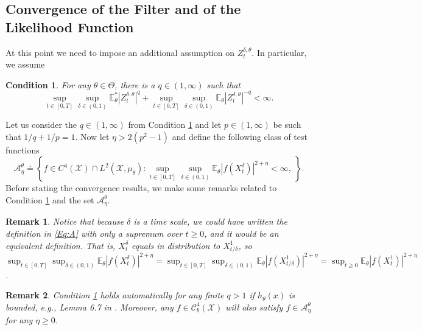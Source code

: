 \documentclass{article}
\newtheorem{remark}{ Remark}
\newtheorem{condition}{Condition}[section]
\begin{document}
\subsection{Convergence of the Filter and of the Likelihood Function}\label{SS:filterLimit}
At this point we need to impose an additional assumption on $Z^{\delta,\theta}_{t}$. In particular, we assume
\begin{condition}
\label{A:Assumption2}
For any $\theta\in\Theta$, there is a $q\in(1,\infty)$ such that
\[
\sup_{t\in[0,T]}\sup_{\delta\in(0,1)}\mathbb{E}_{\theta}^{*}|Z^{\delta,\theta}_{t}|^{q}+\sup_{t\in[0,T]}\sup_{\delta\in(0,1)}\mathbb{E}_{\theta}|Z^{\delta,\theta}_{t}|^{-q}<\infty.
\]
\end{condition}
Let us consider the $q\in(1,\infty)$ from Condition \ref{A:Assumption2} and let $p\in(1,\infty)$ be such that $1/q+1/p=1$.  Now let $\eta>2(p^{2}-1)$ and define the following class of test functions
\begin{equation}
\label{Eq:A}
\mathcal{A}_{\eta}^{\theta}\doteq\left\{f\in C^{4}(\mathcal X)\cap L^{2}(\mathcal{X},\mu_{\theta}): \sup_{t\in[0,T]}\sup_{\delta\in(0,1)}\mathbb{E}_{\theta}\left|f(X^{\delta}_{t})\right|^{2+\eta}<\infty, ~\right\}.
\end{equation}
Before stating the convergence results, we make some remarks related to Condition \ref{A:Assumption2} and the set $\mathcal{A}_{\eta}^{\theta}$.
\begin{remark}
Notice that because $\delta$ is a time scale, we could have written the definition in \eqref{Eq:A} with only a supremum over $t\geq 0$, and it would be an equivalent definition. That is, $X_t^\delta$ equals in distribution to $X_{t/\delta}^1$, so $\sup_{t\in[0,T]}\sup_{\delta\in(0,1)}\mathbb{E}_{\theta}\left|f(X^{\delta}_{t})\right|^{2+\eta}=\sup_{t\in[0,T]}\sup_{\delta\in(0,1)}\mathbb{E}_{\theta}\left|f(X^1_{t/\delta})\right|^{2+\eta}=\sup_{t\geq 0}\mathbb{E}_{\theta}\left|f(X^1_{t})\right|^{2+\eta}$.
\end{remark}
\begin{remark}
\label{R:novikovBoundedH}
Condition \ref{A:Assumption2} holds automatically for any finite $q>1$ if $ h_{\theta}(x)$ is bounded, e.g., Lemma 6.7 in \cite{ImkellerSriPerkowskiYeong2012}. Moreover, any $f\in\mathcal{C}_{b}^{4}(\mathcal{X})$ will also satisfy $f\in \mathcal{A}_{\eta}^{\theta}$ for any $\eta\geq 0$.
\end{remark}
\end{document}
